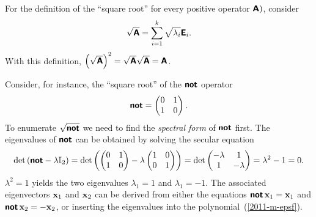 {
For the definition of the ``square root''
for every positive operator $\textsf{\textbf{A}})$, consider
\begin{equation}
\sqrt{\textsf{\textbf{A}}}=\sum_{i=1}^k \sqrt{\lambda_i}  \textsf{\textbf{E}}_i.
\end{equation}
With this definition,
$\left(\sqrt{\textsf{\textbf{A}}}\right)^2=
\sqrt{\textsf{\textbf{A}}}\sqrt{\textsf{\textbf{A}}}= {\textsf{\textbf{A}}}$.

Consider, for instance, the ``square root''  of the $\textsf{\textbf{not}}$ operator
\begin{equation}
\textsf{\textbf{not}}
=
\begin{pmatrix}
 0&1\\  1&0
\end{pmatrix}.
\end{equation}
To enumerate $\sqrt{\textsf{\textbf{not}}}$  we need to find the {\em spectral form} of $\textsf{\textbf{not}}$ first.
The eigenvalues of  $\textsf{\textbf{not}}$ can be obtained by solving the
secular equation
\begin{equation}
\text{det}
\left(
\textsf{\textbf{not}} - \lambda {\Bbb I}_2
\right)
=
\text{det}
\left(
\begin{pmatrix}
 0&1\\  1&0
\end{pmatrix}
-
\lambda
\begin{pmatrix}
1&0\\  0&1
\end{pmatrix}
\right)
=
\text{det}
\begin{pmatrix}
 -\lambda&1\\
1&-\lambda
\end{pmatrix}
   =\lambda^2-1=0.
\end{equation}
$\lambda^2=1$ yields the two eigenvalues
$\lambda_1=1$
and
$\lambda_1=-1$.
The associated eigenvectors
${\bf x}_1$
and
${\bf x}_2$
can be derived from either the equations
$\textsf{\textbf{not}}\,{\bf x}_1={\bf x}_1$
and
$\textsf{\textbf{not}}\,{\bf x}_2=-{\bf x}_2$,
or inserting the eigenvalues into the polynomial~(\ref{2011-m-epsf}).

}
